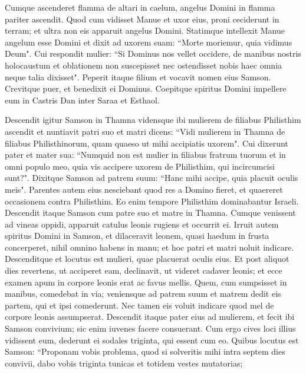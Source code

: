 \begin{biblechapter}
\verse Cumque ascenderet flamma de altari in caelum, angelus Domini in flamma pariter ascendit. Quod cum vidisset Manue et uxor eius, proni ceciderunt in terram;  
\verse et ultra non eis apparuit angelus Domini. Statimque intellexit Manue angelum esse Domini 
\verse et dixit ad uxorem suam: “Morte moriemur, quia vidimus Deum". 
\verse Cui respondit mulier: “Si Dominus nos vellet occidere, de manibus nostris holocaustum et oblationem non suscepisset nec ostendisset nobis haec omnia neque talia dixisset". 
\verse Peperit itaque filium et vocavit nomen eius Samson. Crevitque puer, et benedixit ei Dominus. 
\verse Coepitque spiritus Domini impellere eum in Castris Dan inter Saraa et Esthaol. 
\end{biblechapter}

\begin{biblechapter}  
\verse Descendit igitur Samson in Thamna vidensque ibi mulierem de filiabus Philisthim 
\verse ascendit et nuntiavit patri suo et matri dicens: “Vidi mulierem in Thamna de filiabus Philisthinorum, quam quaeso ut mihi accipiatis uxorem". 
\verse Cui dixerunt pater et mater sua: “Numquid non est mulier in filiabus fratrum tuorum et in omni populo meo, quia vis accipere uxorem de Philisthim, qui incircumcisi sunt?". Dixitque Samson ad patrem suum: “Hanc mihi accipe, quia placuit oculis meis". 
\verse Parentes autem eius nesciebant quod res a Domino fieret, et quaereret occasionem contra Philisthim. Eo enim tempore Philisthim dominabantur Israeli. 
\verse Descendit itaque Samson cum patre suo et matre in Thamna. Cumque venissent ad vineas oppidi, apparuit catulus leonis rugiens et occurrit ei. 
\verse Irruit autem spiritus Domini in Samson, et dilaceravit leonem, quasi haedum in frusta concerperet, nihil omnino habens in manu; et hoc patri et matri noluit indicare. 
\verse Descenditque et locutus est mulieri, quae placuerat oculis eius. 
\verse Et post aliquot dies revertens, ut acciperet eam, declinavit, ut videret cadaver leonis; et ecce examen apum in corpore leonis erat ac favus mellis. 
\verse Quem, cum sumpsisset in manibus, comedebat in via; veniensque ad patrem suum et matrem dedit eis partem, qui et ipsi comederunt. Nec tamen eis voluit indicare quod mel de corpore leonis assumpserat. 
\verse Descendit itaque pater eius ad mulierem, et fecit ibi Samson convivium; sic enim iuvenes facere consuerant. 
\verse Cum ergo cives loci illius vidissent eum, dederunt ei sodales triginta, qui essent cum eo. 
\verse Quibus locutus est Samson: “Proponam vobis problema, quod si solveritis mihi intra septem dies convivii, dabo vobis triginta tunicas et totidem vestes mutatorias; 

\end{biblechapter}
